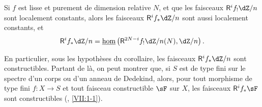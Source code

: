 \begin{corollary}\label{I:6-4-1}
Si $f$ est lisse et purement de dimension relative $N$, et que les faisceaux 
$\R^i f_! \dZ/n$ sont localement constants, alors les faisceaux 
$\R^i f_* \dZ/n$ sont aussi localement constants, et 
\[
  \R^i f_* \dZ/n = \const\hom\left(\R^{2 N-i} f_! \dZ/n(N),\dZ/n\right)\text{.}
\]
\end{corollary}

En particulier, sous les hypothèses du corollaire, les faisceaux 
$\R^i f_* \dZ/n$ sont constructibles. Partant de là, on peut montrer que, si 
$S$ est de type fini sur le spectre d'un corps ou d'un anneau de Dedekind, 
alors, pour tout morphisme de type fini $f:X\to S$ et tout faisceau 
constructible $\sF$ sur $X$, les faisceaux $\R^i f_* \sF$ sont constructibles 
(, \ref{VII:1-1}). 
